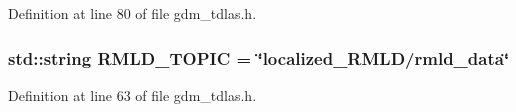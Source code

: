 Definition at line 80 of file gdm\_\-tdlas.h.

\subsubsection[{RMLD\_\-TOPIC}]{\setlength{\rightskip}{0pt plus 5cm}std::string {\bf RMLD\_\-TOPIC} = \char`\"{}localized\_\-RMLD/rmld\_\-data\char`\"{}}\label{gdm__tdlas_8h_af39580a9f105347cdb67f69321780bb8}


Definition at line 63 of file gdm\_\-tdlas.h.

